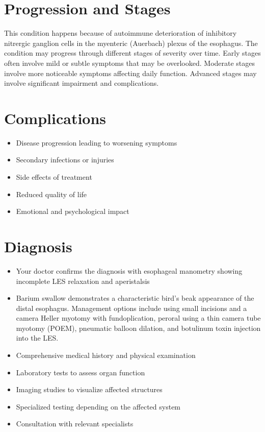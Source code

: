 \section{Progression and Stages}
This condition happens because of autoimmune deterioration of inhibitory nitrergic ganglion cells in the myenteric (Auerbach) plexus of the esophagus. The condition may progress through different stages of severity over time. Early stages often involve mild or subtle symptoms that may be overlooked. Moderate stages involve more noticeable symptoms affecting daily function. Advanced stages may involve significant impairment and complications.
\section{Complications}
\begin{itemize}[noitemsep]
  \item Disease progression leading to worsening symptoms
  \item Secondary infections or injuries
  \item Side effects of treatment
  \item Reduced quality of life
  \item Emotional and psychological impact
\end{itemize}
\section{Diagnosis}
\begin{itemize}[noitemsep]
  \item Your doctor confirms the diagnosis with esophageal manometry showing incomplete LES relaxation and aperistalsis
  \item Barium swallow demonstrates a characteristic bird's beak appearance of the distal esophagus. Management options include using small incisions and a camera Heller myotomy with fundoplication, peroral using a thin camera tube myotomy (POEM), pneumatic balloon dilation, and botulinum toxin injection into the LES.
  \item Comprehensive medical history and physical examination
  \item Laboratory tests to assess organ function
  \item Imaging studies to visualize affected structures
  \item Specialized testing depending on the affected system
  \item Consultation with relevant specialists
\end{itemize}
